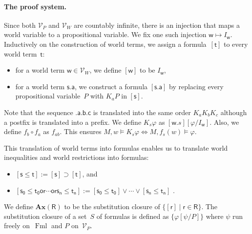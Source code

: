\documentclass[doctor]{iscs-thesis}
\newcommand{\pvar}{\mathcal V_P}
\newcommand{\wvar}{\mathcal V_W}
\newcommand{\fml}{\operatorname{Fml}}
\newcommand{\wor}{\mathsf{{or}}}
\begin{document}
\paragraph{The proof system.}
Since both $\pvar$ and $\wvar$ are countably infinite,
there is an injection that maps a world variable to a propositional
variable.
We fix one such injection
$\mathsf w\mapsto I_{\mathsf w}$.
Inductively on the construction of world terms,
we assign a formula~$[\mathsf t]$ to every world term~$\mathsf t$:
\begin{itemize}
 \item for a world term $\mathsf w\in \wvar$, we define $[\mathsf w]$ to be
       $I_{\mathsf w}$,
 \item for a world term $\mathsf{s.a}$, we construct
 a formula $[\mathsf{s.a}]$ by
replacing every propositional variable~$P$ with $K_aP$ in $[\mathsf s]$.
\end{itemize}
Note that the sequence $\mathsf{.a.b.c}$ is translated into the same
order $K_a K_b K_c$ although a postfix is translated into a prefix.
We define $K_s\varphi$ as $[\mathsf w.s][\varphi/I_{\mathsf w}]$.
Also, we define $f_b\circ f_a$ as $f_{ab}$.  This ensures $M, w\models
K_s\varphi\Leftrightarrow M,f_s(w)\models\varphi$.

This translation of world terms into formulas
enables us to translate world inequalities and world restrictions
into formulas:
\begin{itemize}
 \item $[\mathsf s\le \mathsf t] := [\mathsf s]\supset [\mathsf t]$, and
 \item $[\mathsf{s_0}\le \mathsf{t_0}\wor \cdots\wor \mathsf{s_n}\le \mathsf{t_n}] := [\mathsf{s_0}\le \mathsf{t_0}]\vee
       \cdots \vee [\mathsf{s_n}\le \mathsf{t_n}]$ \enspace.
\end{itemize}

We define $\mathbf{Ax}(\mathsf R)$ to be the substitution closure of
$\{[\mathsf r]\mid \mathsf r\in \mathsf R\}$.
The substitution closure of a set~$S$ of formulas is defined as
$\{\varphi[\psi/P]\}$ where $\psi$ run freely on~$\fml$ and $P$ on~$\pvar$.
\end{document}
